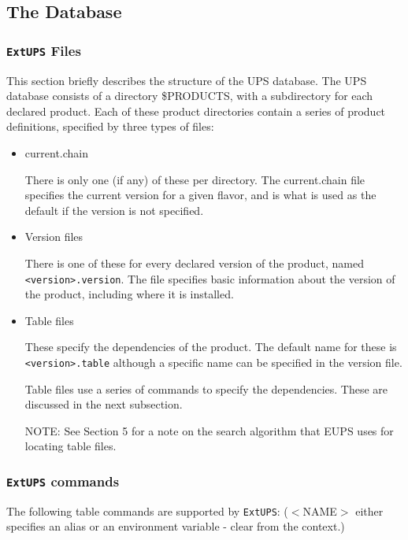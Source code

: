 \documentclass{article}
\newcommand{\code}[1]{\texttt{#1}}
\newcommand{\eups}{\code{ExtUPS}}
\begin{document}
\subsection{The Database}

\subsubsection{\eups{} Files}

This section briefly describes the structure of the UPS database. The UPS database
consists of a directory \$PRODUCTS, with a subdirectory for each declared product.
Each of these product directories contain a series of product definitions, specified
by three types of files:

\begin{itemize}
  \item current.chain

    There is only one (if any) of these per directory.  The
    current.chain file specifies the current version for a given
    flavor, and is what is used as the default if the version is not
    specified.

  \item Version files

    There is one of these for every declared version of the product,
    named \texttt{<version>.version}. The file specifies basic information
    about the version of the product, including where it is installed.

  \item Table files

    These specify the dependencies of the product. The default name
    for these is \texttt{<version>.table} although a specific name can be specified in the
    version file.

    Table files use a series of commands to specify the dependencies. These are
    discussed in the next subsection.

    NOTE: See Section 5 for a note on the search algorithm that EUPS uses for 
    locating table files.
\end{itemize}

\subsubsection{\eups{} commands}

The following table commands are supported by \eups{}: ($<$NAME$>$ either specifies an
alias or an environment variable - clear from the context.)
\end{document}
